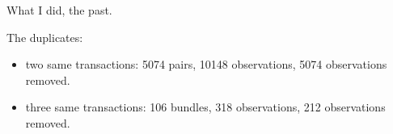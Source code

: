 What I did, the past.
\begin{table}[ht]
\centering
\caption{{\bf Number of observations changes by the cleaning.} The data errors are observations those the year of sale is smaller than the year of build. The maximum and minimum prices boundaries of sold properties are for filtering non market transactions, source from Australian Property Monitors (APM). The overlaps happen, due to observations could fall into several cleaning categories.\setlength{\baselineskip}{1.25em}}
\label{tab_data_cleaning_process}
\setlength{\baselineskip}{1.25em}
\end{table}


The duplicates:
\begin{itemize}
\item two same transactions: 5074 pairs, 10148 observations, 5074 observations removed.
\item three same transactions: 106 bundles, 318 observations, 212 observations removed.
\end{itemize}